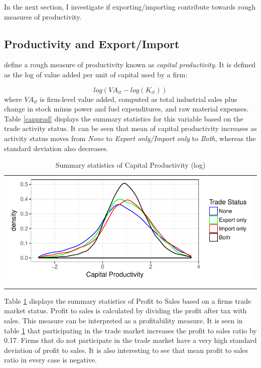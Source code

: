 \documentclass[11pt]{article}
\begin{document}
In the next section, I investigate if exporting/importing contribute
towards rough measures of productivity. 
\subsection{Productivity and Export/Import}
\cite{gupta2018exporting} define a rough measure of productivity known
as \textit{capital productivity}. It is defined as the log of value added per
unit of capital used by a firm:

$$ log(VA_{it} - log(K_{it}))$$
where $VA_{it}$ is firm-level value added, computed as total industrial sales plus
change in stock minus power and fuel expenditures, and raw material
expenses. 
 Table \ref{capprod} displays the summary statistics for this variable
based on the trade activity status. It can be seen that mean of capital
productivity increases as activity status moves from \textit{None} to
\textit{Export only/Import only} to \textit{Both}, whereas the
standard deviation also decreases.  
\begin{center}
\begin{table}[htp]
\caption{Summary statistics of Capital Productivity (log)}
\label{tab:capprod}
\begin{tabular}{c}
 \includegraphics{./PICS/denscapprod.pdf}   \\ 
   \\  
\end{tabular}
\end{table}
\end{center}

Table \ref{tab:capprod} displays the summary statistics of Profit to Sales based on a
firms trade market status. Profit to sales is calculated by dividing
the profit after tax with sales. This measure can be interpreted as a
profitability measure. It is seen in table \ref{tab:capprod} that participating in
the trade market increases the profit to sales ratio by 0.17. Firms that do
not participate in the trade market have a very high standard
deviation of profit to sales. It is also interesting to see that mean
profit to sales ratio in every case is negative. 
\end{document}
